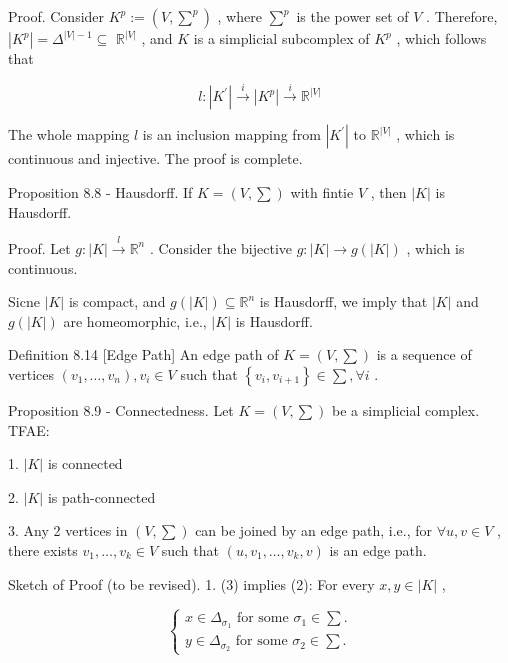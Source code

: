 Proof. Consider \({K}^{p} \mathrel{\text{ := }} \left( {V,{\sum }^{p}}\right)\) , where \({\sum }^{p}\) is the power set of \(V\) . Therefore, \(\left| {K}^{p}\right|  = {\Delta }^{\left| V\right|  - 1} \subseteq\)  \({\mathbb{R}}^{\left| V\right| }\) , and \(K\) is a simplicial subcomplex of \({K}^{p}\) , which follows that

\[
l : \left| {K}^{\prime }\right| \overset{i}{ \rightarrow  }\left| {K}^{p}\right| \overset{i}{ \rightarrow  }{\mathbb{R}}^{\left| V\right| }
\]

The whole mapping \(l\) is an inclusion mapping from \(\left| {K}^{\prime }\right|\) to \({\mathbb{R}}^{\left| V\right| }\) , which is continuous and injective. The proof is complete.

Proposition 8.8 - Hausdorff. If \(K = \left( {V,\sum }\right)\) with fintie \(V\) , then \(\left| K\right|\) is Hausdorff.

Proof. Let \(g : \left| K\right| \overset{l}{ \rightarrow  }{\mathbb{R}}^{n}\) . Consider the bijective \(g : \left| K\right|  \rightarrow  g\left( \left| K\right| \right)\) , which is continuous.

Sicne \(\left| K\right|\) is compact, and \(g\left( \left| K\right| \right)  \subseteq  {\mathbb{R}}^{n}\) is Hausdorff, we imply that \(\left| K\right|\) and \(g\left( \left| K\right| \right)\) are homeomorphic, i.e., \(\left| K\right|\) is Hausdorff.

Definition 8.14 [Edge Path] An edge path of \(K = \left( {V,\sum }\right)\) is a sequence of vertices \(\left( {{v}_{1},\ldots ,{v}_{n}}\right) ,{v}_{i} \in  V\) such that \(\left\{  {{v}_{i},{v}_{i + 1}}\right\}   \in  \sum ,\forall i\) .

Proposition 8.9 - Connectedness. Let \(K = \left( {V,\sum }\right)\) be a simplicial complex. TFAE:

1. \(\left| K\right|\) is connected

2. \(\left| K\right|\) is path-connected

3. Any 2 vertices in \(\left( {V,\sum }\right)\) can be joined by an edge path, i.e., for \(\forall u,v \in  V\) , there exists \({v}_{1},\ldots ,{v}_{k} \in  V\) such that \(\left( {u,{v}_{1},\ldots ,{v}_{k},v}\right)\) is an edge path.

Sketch of Proof (to be revised). 1. (3) implies (2): For every \(x,y \in  \left| K\right|\) ,

\[
\left\{  \begin{array}{l} x \in  {\Delta }_{{\sigma }_{1}}\text{ for some }{\sigma }_{1} \in  \sum . \\  y \in  {\Delta }_{{\sigma }_{2}}\text{ for some }{\sigma }_{2} \in  \sum . \end{array}\right.
\]


